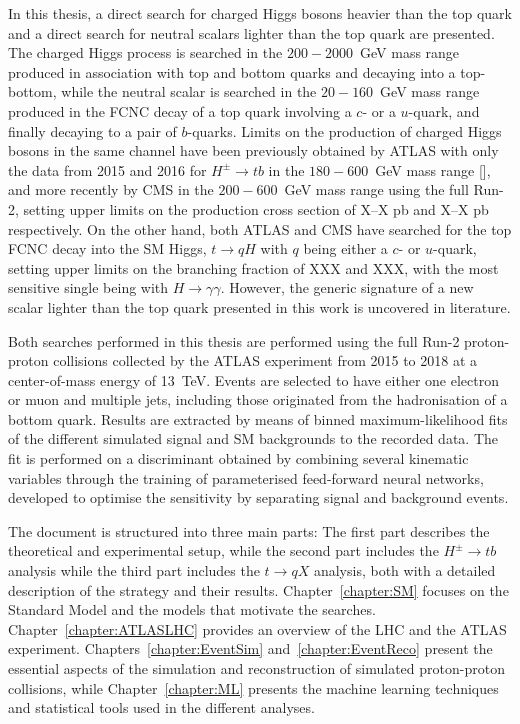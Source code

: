 In this thesis, a direct search for charged Higgs bosons heavier than the top quark and a direct search for neutral scalars lighter than the top quark are presented. The charged Higgs process is searched in the $200-2000$~GeV mass range produced in association with top and bottom quarks and decaying into a top-bottom, while the neutral scalar is searched in the $20-160$~GeV mass range produced in the FCNC decay of a top quark involving a $c$- or a $u$-quark, and finally decaying to a pair of $b$-quarks. Limits on the production of charged Higgs bosons in the same channel have been previously obtained by ATLAS with only the data from 2015 and 2016 for $H^\pm\to tb$ in the $180-600$~GeV mass range [], and more recently by CMS in the $200-600$~GeV mass range using the full Run-2, setting upper limits on the production cross section of X--X pb and X--X pb respectively. On the other hand, both ATLAS and CMS have searched for the top FCNC decay into the SM Higgs, $t\to qH$ with $q$ being either a $c$- or $u$-quark, setting upper limits on the branching fraction of XXX and XXX, with the most sensitive single being with $H\to\gamma\gamma$. However, the generic signature of a new scalar lighter than the top quark presented in this work is uncovered in literature.

Both searches performed in this thesis are performed using the full Run-2 proton-proton collisions collected by the ATLAS experiment from 2015 to 2018 at a center-of-mass energy of 13~TeV. Events are selected to have either one electron or muon and multiple jets, including those originated from the hadronisation of a bottom quark. Results are extracted by means of binned maximum-likelihood fits of the different simulated signal and SM backgrounds to the recorded data. The fit is performed on a discriminant obtained by combining several kinematic variables through the training of parameterised feed-forward neural networks, developed to optimise the sensitivity by separating signal and background events.

The document is structured into three main parts: The first part describes the theoretical and experimental setup, while the second part includes the $H^\pm\to tb$ analysis while the third part includes the $t\to qX$ analysis, both with a detailed description of the strategy and their results. Chapter~\ref{chapter:SM} focuses on the Standard Model and the models that motivate the searches. Chapter~\ref{chapter:ATLASLHC} provides an overview of the LHC and the ATLAS experiment. Chapters~\ref{chapter:EventSim} and~\ref{chapter:EventReco} present the essential aspects of the simulation and reconstruction of simulated proton-proton collisions, while Chapter~\ref{chapter:ML} presents the machine learning techniques and statistical tools used in the different analyses.  %
